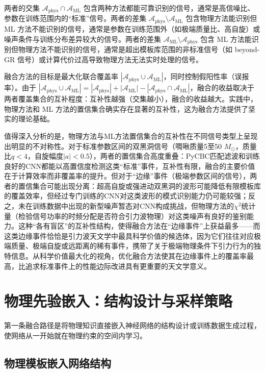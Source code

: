 两者的交集 $\mathcal{A}_{\text{phys}} \cap \mathcal{A}_{\text{ML}}$ 包含两种方法都能可靠识别的信号，通常是高信噪比、参数在训练范围内的“标准”信号。两者的差集 $\mathcal{A}_{\text{phys}} \setminus \mathcal{A}_{\text{ML}}$ 包含物理方法能识别但 ML 方法不能识别的信号，通常是参数在训练范围外（如极端质量比、高自旋）或噪声条件与训练分布差异较大的信号。两者的差集 $\mathcal{A}_{\text{ML}} \setminus \mathcal{A}_{\text{phys}}$ 包含 ML 方法能识别但物理方法不能识别的信号，通常是超出模板库范围的非标准信号（如 beyond-GR 信号）或计算代价过高导致物理方法无法实时处理的信号。

融合方法的目标是最大化联合覆盖率 $|\mathcal{A}_{\text{phys}} \cup \mathcal{A}_{\text{ML}}|$，同时控制假阳性率（误报率）。由于 $|\mathcal{A}_{\text{phys}} \cup \mathcal{A}_{\text{ML}}| = |\mathcal{A}_{\text{phys}}| + |\mathcal{A}_{\text{ML}}| - |\mathcal{A}_{\text{phys}} \cap \mathcal{A}_{\text{ML}}|$，融合的收益取决于两者覆盖集合的互补程度：互补性越强（交集越小），融合的收益越大。实践中，物理方法和 ML 方法的置信集合确实存在显著的互补性，这为融合方法提供了坚实的理论基础。

值得深入分析的是，物理方法与ML方法置信集合的互补性在不同信号类型上呈现出明显的不对称性。对于标准参数区间的双黑洞信号（啁啾质量5至50 $M_\odot$，质量比$q<4$，自旋幅度$|a|<0.5$），两者的置信集合高度重叠：PyCBC匹配滤波和训练良好的CNN都能以高置信度检测这类“标准”事件，互补性有限，融合的主要价值在于计算效率而非覆盖率的提升。但对于“边缘”事件（极端参数区间的信号），两者的置信集合可能出现分离：超高自旋或强进动双黑洞的波形可能降低有限模板库的覆盖效率，但经过专门训练的CNN对这类波形的模式识别能力仍可能较强；反之，未在训练数据中出现的新型噪声暂态对CNN构成挑战，但物理方法的$\chi^2$统计量（检验信号功率的时频分配是否符合引力波物理）对这类噪声有良好的鉴别能力。这种“各有盲区”的互补性结构，使得融合方法在“边缘事件”上获益最多——而这类边缘事件恰恰是引力波天文学中最具科学价值的候选体，因为它们往往对应极端质量、极端自旋或远距离的稀有事件，携带了关于极端物理条件下引力行为的独特信息。从科学价值最大化的视角，优化融合方法使其在边缘事件上的覆盖率最高，比追求标准事件上的性能边际改进具有更重要的天文学意义。

\section{物理先验嵌入：结构设计与采样策略}

第一条融合路径是将物理知识直接嵌入神经网络的结构设计或训练数据生成过程，使网络从一开始就在物理约束的空间内学习。

\subsection{物理模板嵌入网络结构}

